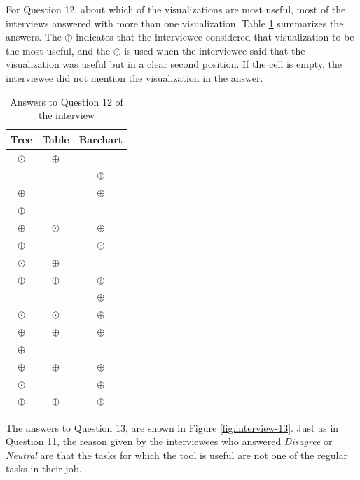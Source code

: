 For Question 12, about which of the visualizations are most useful, most of the interviews answered with more than one visualization. Table \ref{table:interview-12} summarizes the answers. The $\oplus$ indicates that the interviewee considered that visualization to be the most useful, and the $\odot$ is used when the interviewee said that the visualization was useful but in a clear second position. If the cell is empty, the interviewee did not mention the visualization in the answer.

\begin{table}[ht]
    \begin{center}
    \begin{tabular}{|c|c|c|}
    \hline
    Tree      & Table     & Barchart \\
    \hline\hline
    $\odot$   & $\oplus$  & ~        \\\hline
    ~	        & ~	        & $\oplus$ \\\hline
    $\oplus$  & ~         & $\oplus$ \\\hline
    $\oplus$	& ~         & ~        \\\hline
    $\oplus$	& $\odot$	  & $\oplus$ \\\hline
    $\oplus$	& ~         & $\odot$  \\\hline
    $\odot$	  & $\oplus$	& ~        \\\hline
    $\oplus$	& $\oplus$	& $\oplus$ \\\hline
    ~	        & ~	        & $\oplus$ \\\hline
    $\odot$	  & $\odot$	  & $\oplus$ \\\hline
    $\oplus$	& $\oplus$	& $\oplus$ \\\hline
    $\oplus$	& ~	        & ~        \\\hline
    $\oplus$	& $\oplus$	& $\oplus$ \\\hline
    $\odot$	  & ~	        & $\oplus$ \\\hline
    $\oplus$	& $\oplus$	& $\oplus$ \\\hline
    \end{tabular}
    \end{center}
    \caption{Answers to Question 12 of the interview}
    \label{table:interview-12}
\end{table}

The answers to Question 13, are shown in Figure \ref{fig:interview-13}. Just as in Question 11, the reason given by the interviewees who answered \textit{Disagree} or \textit{Neutral} are that the tasks for which the tool is useful are not one of the regular tasks in their job.

